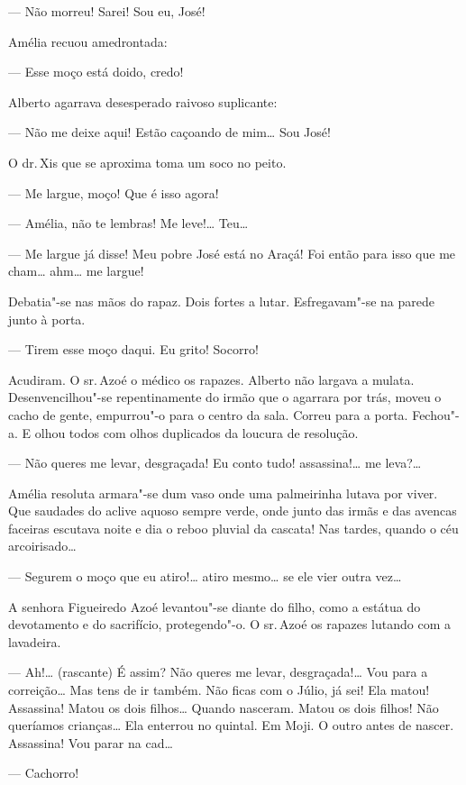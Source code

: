 --- Não morreu! Sarei! Sou eu, José!

Amélia recuou amedrontada:

--- Esse moço está doido, credo!

Alberto agarrava desesperado raivoso suplicante:

--- Não me deixe aqui! Estão caçoando de mim\ldots{} Sou José!

O dr.\,Xis que se aproxima toma um soco no peito.

--- Me largue, moço! Que é isso agora!

--- Amélia, não te lembras! Me leve!\ldots{} Teu\ldots{}

--- Me largue já disse! Meu pobre José está no Araçá! Foi então para
isso que me cham\ldots{} ahm\ldots{} me largue!

Debatia"-se nas mãos do rapaz. Dois fortes a lutar. Esfregavam"-se na
parede junto à porta.

--- Tirem esse moço daqui. Eu grito! Socorro!

Acudiram. O sr.\,Azoé o médico os rapazes. Alberto não largava a mulata.
Desenvencilhou"-se repentinamente do irmão que o agarrara por trás, moveu
o cacho de gente, empurrou"-o para o centro da sala. Correu para a porta.
Fechou"-a. E olhou todos com olhos duplicados da loucura de resolução.

--- Não queres me levar, desgraçada! Eu conto tudo! assassina!\ldots{} me
leva?\ldots{}

Amélia resoluta armara"-se dum vaso onde uma palmeirinha lutava por
viver. Que saudades do aclive aquoso sempre verde, onde junto das irmãs
e das avencas faceiras escutava noite e dia o reboo pluvial da cascata!
Nas tardes, quando o céu arcoirisado\ldots{}

--- Segurem o moço que eu atiro!\ldots{} atiro mesmo\ldots{} se ele vier outra
vez\ldots{}

A senhora Figueiredo Azoé levantou"-se diante do filho, como a estátua do
devotamento e do sacrifício, protegendo"-o. O sr.\,Azoé os rapazes lutando
com a lavadeira.

--- Ah!\ldots{} (rascante) É assim? Não queres me levar, desgraçada!\ldots{} Vou
para a correição\ldots{} Mas tens de ir também. Não ficas com o Júlio, já
sei! Ela matou! Assassina! Matou os dois filhos\ldots{} Quando nasceram.
Matou os dois filhos! Não queríamos crianças\ldots{} Ela enterrou no quintal.
Em Moji. O outro antes de nascer. Assassina! Vou parar na cad\ldots{}

--- Cachorro!

